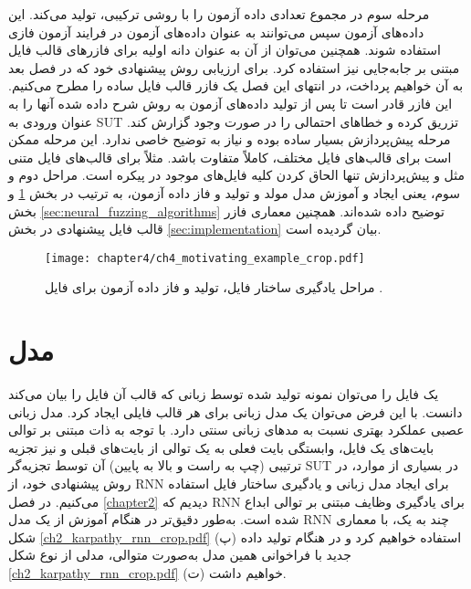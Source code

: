 مرحله سوم در مجموع تعدادی داده آزمون را با روشی ترکیبی، تولید می‌کند. این داده‌های آزمون سپس می‌توانند به عنوان داده‌های آزمون در فرایند آزمون فازی استفاده شوند. همچنین می‌توان از آن به عنوان دانه اولیه برای فازرهای قالب فایل مبتنی بر جابه‌جایی نیز استفاده کرد. برای ارزیابی روش پیشنهادی خود که در فصل بعد به آن خواهیم پرداخت، در انتهای این فصل یک فازر قالب فایل ساده را مطرح می‌کنیم. این فازر قادر است تا پس از تولید داده‌های آزمون به روش شرح داده شده آنها را به عنوان ورودی به 
\gls{SUT}
تزریق کرده و خطاهای احتمالی را در صورت وجود گزارش کند. مرحله پیش‌پردازش بسیار ساده بوده و نیاز به توضیح خاصی ندارد. این مرحله ممکن است برای قالب‌های فایل مختلف، کاملاً متفاوت باشد. مثلاً برای قالب‌های فایل متنی مثل
و 
پیش‌پردازش تنها الحاق کردن کلیه فایل‌های موجود در پیکره است. مراحل دوم و سوم، یعنی ایجاد و آموزش مدل مولد و تولید و فاز داده آزمون، به ترتیب در بخش 
\ref{sec:model}
 و بخش 
 \ref{sec:neural_fuzzing_algorithms}
 توضیح داده شده‌اند. همچنین معماری فازر قالب فایل پیشنهادی در بخش 
 \ref{sec:implementation}
بیان گردیده است.


 

\begin{figure}
	\centering
	\texttt{[image: chapter4/ch4\_motivating\_example\_crop.pdf]}
	\caption[مراحل یادگیری ساختار فایل، تولید و فاز داده آزمون برای فایل ]
	{
		مراحل یادگیری ساختار فایل، تولید و فاز داده آزمون برای فایل . 
	}
	\label{ch4_motivating_example}
\end{figure}


\section{مدل}\label{sec:model}
یک فایل را می‌توان نمونه تولید شده توسط زبانی که قالب آن فایل را بیان می‌کند دانست. با این فرض می‌توان یک مدل زبانی برای هر قالب فایلی ایجاد کرد. مدل زبانی عصبی عملکرد بهتری نسبت به مد‌های زبانی سنتی دارد. با توجه به ذات مبتنی بر توالی بایت‌های یک فایل، وابستگی بایت فعلی به یک توالی از بایت‌‌های قبلی و نیز تجزیه ترتیبی (چپ به راست و بالا به پایین) آن توسط تجزیه‌گر \gls{SUT} در بسیاری از موارد، در روش پیشنهادی خود، از \gls{RNN} برای ایجاد مدل زبانی و یادگیری ساختار فایل استفاده می‌کنیم. در فصل \ref{chapter2} دیدیم که \gls{RNN} برای یادگیری وظایف مبتنی بر توالی ابداع شده است. به‌طور دقیق‌تر در هنگام آموزش از یک مدل \gls{RNN} چند به یک، با معماری شکل \ref{ch2_karpathy_rnn_crop.pdf} (پ) استفاده خواهیم کرد و در هنگام تولید داده‌ جدید با فراخوانی همین مدل به‌صورت متوالی، مدلی از نوع شکل \ref{ch2_karpathy_rnn_crop.pdf} (ت) خواهیم داشت.

